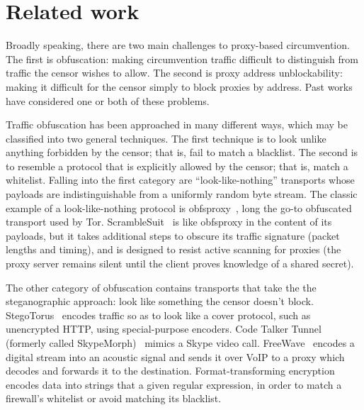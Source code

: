 \documentclass{article}
\begin{document}

\section{Related work}


Broadly speaking, there are two main challenges to proxy-based circumvention.
The first is obfuscation: making circumvention traffic difficult to distinguish
from traffic the censor wishes to allow. The second is proxy address
unblockability: making it difficult for the censor simply to block proxies by
address. Past works have considered one or both of these problems.

Traffic obfuscation has been approached in many different ways,
which may be classified into two general techniques.
The first technique is to look unlike
anything forbidden by the censor; that is, fail to match a blacklist. The second is
to resemble a protocol that is explicitly allowed by the censor; that is, match a whitelist.
Falling into the first category are ``look-like-nothing'' transports whose
payloads are indistinguishable from a uniformly random byte stream.
The classic example of a look-like-nothing
protocol is obfsproxy~\cite{obfsproxy}, long the go-to obfuscated
transport used by Tor. ScrambleSuit~\cite{scramblesuit} is like obfsproxy in the
content of its payloads, but it takes additional steps to obscure its traffic signature
(packet lengths and timing), and is designed to resist active scanning for proxies
(the proxy server remains silent until the client proves knowledge of a shared
secret).

The other category of obfuscation contains transports that take the the steganographic approach: look like
something the censor doesn't block. StegoTorus~\cite{stegotorus}
encodes traffic so as to look like a cover protocol, such as unencrypted HTTP,
using special-purpose encoders.
Code Talker
Tunnel (formerly called SkypeMorph)~\cite{skypemorph} mimics a Skype video call.
FreeWave~\cite{freewave} encodes a digital stream into an acoustic signal
and sends it over VoIP to a proxy which decodes and forwards it to the destination.
Format-transforming encryption~\cite{fte} encodes data into strings that a given regular expression,
in order to match a firewall's whitelist or avoid matching its blacklist.
\end{document}
